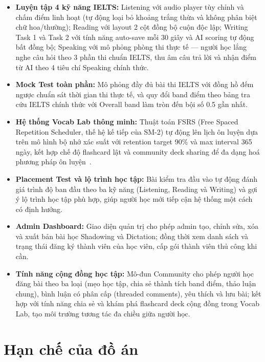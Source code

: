 \begin{itemize}
    \item \textbf{Luyện tập 4 kỹ năng IELTS:} Listening với audio player tùy chỉnh và chấm điểm linh hoạt (tự động loại bỏ khoảng trắng thừa và không phân biệt chữ hoa/thường); Reading với layout 2 cột đồng bộ cuộn độc lập; Writing Task 1 và Task 2 với tính năng auto-save mỗi 30 giây và AI scoring tự động bất đồng bộ; Speaking với mô phỏng phòng thi thực tế --- người học lắng nghe câu hỏi theo 3 phần thi chuẩn IELTS, thu âm câu trả lời và nhận điểm từ AI theo 4 tiêu chí Speaking chính thức.

    \item \textbf{Mock Test toàn phần:} Mô phỏng đầy đủ bài thi IELTS với đồng hồ đếm ngược chuẩn sát thời gian thi thực tế, và quy đổi band điểm theo bảng tra cứu IELTS chính thức với Overall band làm tròn đến bội số 0.5 gần nhất.

    \item \textbf{Hệ thống Vocab Lab thông minh:} Thuật toán FSRS (Free Spaced Repetition Scheduler, thế hệ kế tiếp của SM-2) tự động lên lịch ôn luyện dựa trên mô hình bộ nhớ xác suất với retention target 90\% và max interval 365 ngày, kết hợp chế độ flashcard lật và community deck sharing để đa dạng hoá phương pháp ôn luyện~\cite{ye2022fsrs}.

    \item \textbf{Placement Test và lộ trình học tập:} Bài kiểm tra đầu vào tự động đánh giá trình độ ban đầu theo ba kỹ năng (Listening, Reading và Writing) và gợi ý lộ trình học tập phù hợp, giúp người học mới tiếp cận hệ thống một cách có định hướng.

    \item \textbf{Admin Dashboard:} Giao diện quản trị cho phép admin tạo, chỉnh sửa, xóa và xuất bản bài học Shadowing và Dictation; đồng thời xem danh sách và trạng thái đăng ký thành viên của học viên, cấp gói thành viên thủ công khi cần.

    \item \textbf{Tính năng cộng đồng học tập:} Mô-đun Community cho phép người học đăng bài theo ba loại (mẹo học tập, chia sẻ thành tích band điểm, thảo luận chung), bình luận có phân cấp (threaded comments), yêu thích và lưu bài; kết hợp với tính năng chia sẻ và khám phá flashcard deck cộng đồng trong Vocab Lab, tạo môi trường tương tác đa chiều giữa người học.
\end{itemize}

\section{Hạn chế của đồ án}

